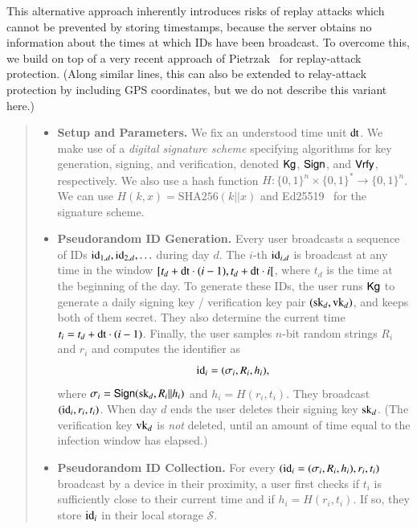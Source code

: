 \documentclass{article}
\begin{document}
This alternative approach inherently introduces risks of replay attacks which cannot be prevented by storing timestamps, because the server obtains no information about the times at which IDs have been broadcast. To overcome this, we build on top of a very recent approach of Pietrzak~\cite{EPRINT:Pietrzak20} for replay-attack protection. (Along similar lines, this can also be extended to relay-attack protection by including GPS coordinates, but we do not describe this variant here.)

\begin{quote}
\begin{itemize}
    \item {\bf Setup and Parameters.} We fix an understood time unit $\mathrm{dt}$. We make use of a \emph{digital signature scheme} specifying algorithms for key generation, signing, and verification, denoted $\mathsf{Kg}$, $\mathsf{Sign}$, and $\mathsf{Vrfy}$, respectively. We also use a hash function $H:\{0,1\}^n\times\{0,1\}^\ast\to\{0,1\}^n$. We can use $H(k,x)=\textrm{SHA256}(k||x)$ and Ed25519~\cite{bernstein,Ed25519} for the signature scheme.
    \item {\bf Pseudorandom ID Generation.} Every user broadcasts a sequence of IDs $\mathrm{id}_{1,d}, \mathrm{id}_{2,d}, \ldots$ during day $d$.  The $i$-th $\mathrm{id}_{i,d}$ is broadcast at any time in the window $[t_d+ \mathrm{dt}\cdot (i-1), t_d + \mathrm{dt}\cdot i[$, where $t_d$ is the time at the beginning of the day. To generate these IDs, the user runs $\mathsf{Kg}$ to generate a daily signing key / verification key pair $(\mathrm{sk}_{d}, \mathrm{vk}_{d})$, and keeps both of them secret. They also determine the current time $t_i=t_d+ \mathrm{dt}\cdot (i-1)$. %
    Finally, the user samples $n$-bit random strings $R_i$ and $r_i$ and computes the identifier as 
		\begin{displaymath}
		\mathrm{id}_i = (\sigma_i, R_i, h_i), \;
		\end{displaymath}
		where $\sigma_i = \mathsf{Sign}(\mathrm{sk}_{d}, R_i|| h_i)$ and $h_i=H(r_i, t_i)$.
		They broadcast $(\mathrm{id}_i, r_i, t_i)$.
		When day $d$ ends the user deletes their signing key $\mathrm{sk}_d$. (The verification key $\mathrm{vk}_d$ is {\em not} deleted, until an amount of time equal to the infection window has elapsed.)
	\item {\bf Pseudorandom ID Collection.} For every $(\mathrm{id}_i = (\sigma_i, R_i, h_i),r_i, t_i)$ broadcast by a device in their proximity, a user first checks if $t_i$ is sufficiently close to their current time and if $h_i = H(r_i, t_i)$. If so, they store $\mathrm{id}_i$ in their local storage $\mathcal{S}$.

\end{itemize}
\end{quote}
\end{document}
